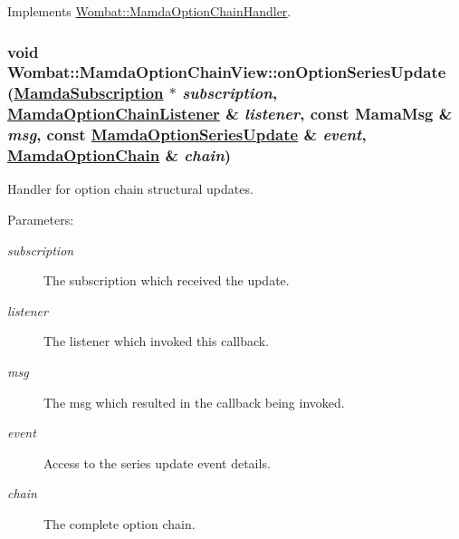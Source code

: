 Implements \hyperlink{classWombat_1_1MamdaOptionChainHandler_a3cfccdc231b70111443aa096cf9a606}{Wombat::Mamda\-Option\-Chain\-Handler}.\hypertarget{classWombat_1_1MamdaOptionChainView_749c42258d71ce7e20d6d2cd71b22d13}{
\subsubsection[onOptionSeriesUpdate]{\setlength{\rightskip}{0pt plus 5cm}void Wombat::Mamda\-Option\-Chain\-View::on\-Option\-Series\-Update (\hyperlink{classWombat_1_1MamdaSubscription}{Mamda\-Subscription} $\ast$ {\em subscription}, \hyperlink{classWombat_1_1MamdaOptionChainListener}{Mamda\-Option\-Chain\-Listener} \& {\em listener}, const Mama\-Msg \& {\em msg}, const \hyperlink{classWombat_1_1MamdaOptionSeriesUpdate}{Mamda\-Option\-Series\-Update} \& {\em event}, \hyperlink{classWombat_1_1MamdaOptionChain}{Mamda\-Option\-Chain} \& {\em chain})}}
\label{classWombat_1_1MamdaOptionChainView_749c42258d71ce7e20d6d2cd71b22d13}


Handler for option chain structural updates. 

\begin{Desc}
\item[Parameters:]
\begin{description}
\item[{\em subscription}]The subscription which received the update. \item[{\em listener}]The listener which invoked this callback. \item[{\em msg}]The msg which resulted in the callback being invoked. \item[{\em event}]Access to the series update event details. \item[{\em chain}]The complete option chain. \end{description}
\end{Desc}


